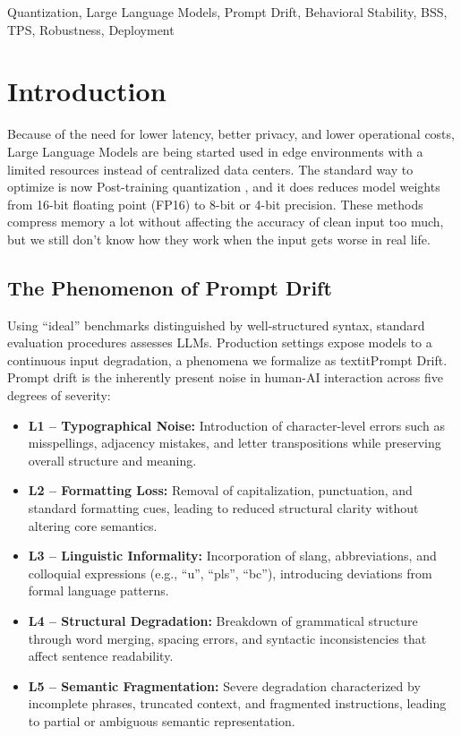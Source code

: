 \documentclass[conference]{IEEEtran}
\begin{document}
\begin{IEEEkeywords}
Quantization, Large Language Models, Prompt Drift, Behavioral Stability, BSS, TPS, Robustness, Deployment
\end{IEEEkeywords}

\section{Introduction}

Because of the need for lower latency, better privacy, and lower operational costs, Large Language Models are  being started used in edge environments with a limited resources instead of centralized data centers. The standard way to optimize  is now Post-training quantization , and it  does reduces model weights from 16-bit floating point (FP16) to 8-bit or 4-bit precision. These methods compress memory a lot without affecting the accuracy of clean input too much, but we still don't know how they work when the input gets worse in real life.

\subsection{The Phenomenon of Prompt Drift}

Using ``ideal'' benchmarks distinguished by well-structured syntax, standard evaluation procedures assesses LLMs. Production settings expose models to a continuous input degradation, a phenomena we formalize as textit{Prompt Drift}. Prompt drift is the inherently present noise in human-AI interaction across five degrees of severity:

\begin{itemize}
\item \textbf{L1 – Typographical Noise:} Introduction of character-level errors such as misspellings, adjacency mistakes, and letter transpositions while preserving overall structure and meaning.
    
\item \textbf{L2 – Formatting Loss:} Removal of capitalization, punctuation, and standard formatting cues, leading to reduced structural clarity without altering core semantics.

\item \textbf{L3 – Linguistic Informality:} Incorporation of slang, abbreviations, and colloquial expressions (e.g., ``u'', ``pls'', ``bc''), introducing deviations from formal language patterns.

\item \textbf{L4 – Structural Degradation:} Breakdown of grammatical structure through word merging, spacing errors, and syntactic inconsistencies that affect sentence readability.

\item \textbf{L5 – Semantic Fragmentation:} Severe degradation characterized by incomplete phrases, truncated context, and fragmented instructions, leading to partial or ambiguous semantic representation.
\end{itemize}
\end{document}
